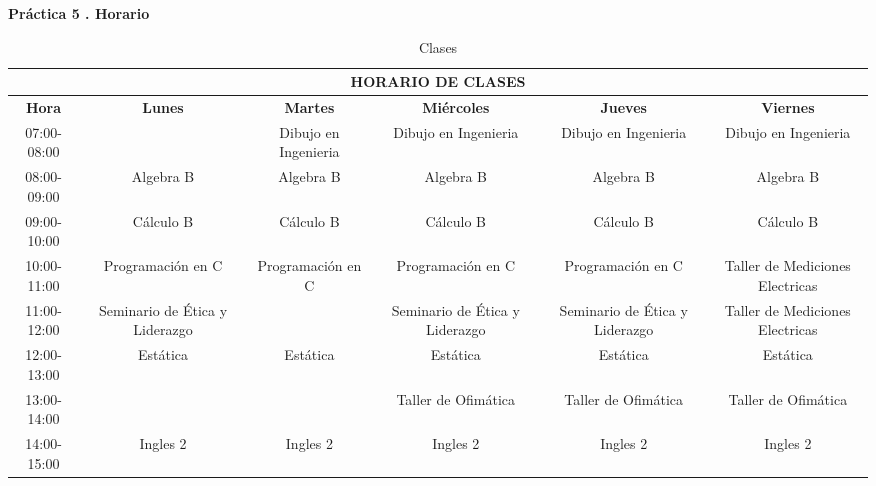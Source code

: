 \documentclass[landscape]{article}
\begin{document}
\begin{center}
    \textbf{Práctica 5 . Horario}
    
    \end{center}
\vspace{5cm}

\centering
\begin{table}[h]
    \centering
    \begin{tabular}{c|c|c|c|c|c}
    \hline
     
\multicolumn{6}{|c|}{ \textbf{HORARIO DE CLASES}}\\ \hline
    \textbf{Hora}&\textbf{Lunes}&\textbf{Martes}&\textbf{Miércoles}&\textbf{Jueves}&\textbf{Viernes}\\ \hline
         07:00-08:00&&Dibujo en Ingenieria&Dibujo en Ingenieria&Dibujo en Ingenieria&Dibujo en Ingenieria\\ \hline
         08:00-09:00&Algebra B&Algebra B&Algebra B&Algebra B&Algebra B\\ \hline
         09:00-10:00&Cálculo B&Cálculo B&Cálculo B&Cálculo B&Cálculo B\\ \hline
         10:00-11:00&Programación en C&Programación en C&Programación en C&Programación en C&Taller de Mediciones Electricas\\ \hline
         11:00-12:00&Seminario de Ética y Liderazgo&&Seminario de Ética y Liderazgo&Seminario de Ética y Liderazgo&Taller de Mediciones Electricas\\ \hline
         12:00-13:00&Estática&Estática&Estática&Estática&Estática\\ \hline
         13:00-14:00&&&Taller de Ofimática&Taller de Ofimática&Taller de Ofimática\\ \hline
         14:00-15:00&Ingles 2&Ingles 2&Ingles 2&Ingles 2&Ingles 2\\ \hline
         
    \end{tabular}
    \caption{Clases}

    
    \label{tab:placeholder}
\end{table} 
\end{document}
